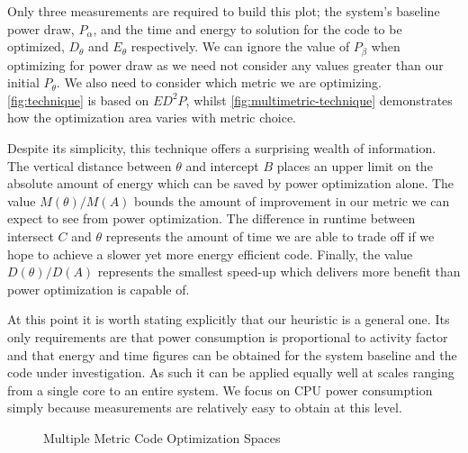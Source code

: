 Only three measurements are required to build this plot; the system's baseline power draw, $P_\alpha$, and the time and energy to solution for the code to be optimized, $D_\theta$ and $E_\theta$ respectively. We can ignore the value of $P_\beta$ when optimizing for power draw as we need not consider any values greater than our initial $P_\theta$. We also need to consider which metric we are optimizing. \autoref{fig:technique} is based on $ED^2P$, whilst \autoref{fig:multimetric-technique} demonstrates how the optimization area varies with metric choice.

Despite its simplicity, this technique offers a surprising wealth of information. The vertical distance between $\theta$ and intercept $B$ places an upper limit on the absolute amount of energy which can be saved by power optimization alone. The value $M(\theta) / M(A)$ bounds the amount of improvement in our metric we can expect to see from power optimization. The difference in runtime between intersect $C$ and $\theta$ represents the amount of time we are able to trade off if we hope to achieve a slower yet more energy efficient code. Finally, the value $D(\theta) / D(A)$ represents the smallest speed-up which delivers more benefit than power optimization is capable of.

At this point it is worth stating explicitly that our heuristic is a general one. Its only requirements are that power consumption is proportional to activity factor and that energy and time figures can be obtained for the system baseline and the code under investigation. As such it can be applied equally well at scales ranging from a single core to an entire system. We focus on CPU power consumption simply because measurements are relatively easy to obtain at this level.

\begin{figure}
\centering

\caption{Multiple Metric Code Optimization Spaces}
\label{fig:multimetric-technique}
\end{figure}
